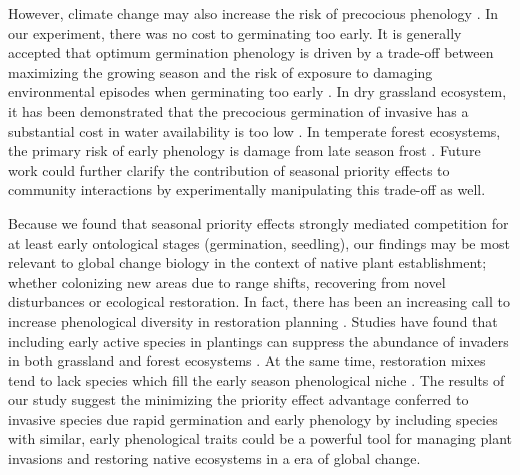 \documentclass{article}[11pt]
\begin{document}
However, climate change may also increase the risk of precocious phenology \citep{Inouye:2000ud}. In our experiment, there was no cost to germinating too early. It is generally accepted that optimum germination phenology is driven by a trade-off between maximizing the growing season and the risk of exposure to damaging environmental episodes when germinating too early \citep{Augspurger:2017vu}. In dry grassland ecosystem, it has been demonstrated that the precocious germination of invasive has a substantial cost in water availability is too low \citep{Wainwright_2011}. In temperate forest ecosystems, the primary risk of early phenology is damage from late season frost \citep{Kollas:2014vn}. Future work could further clarify the contribution of seasonal priority effects to community interactions by experimentally manipulating this trade-off as well.

Because we found that seasonal priority effects strongly mediated competition for at least early ontological stages (germination, seedling), our findings may be most relevant to global change biology in the context of native plant establishment; whether colonizing new areas due to range shifts, recovering from novel disturbances or ecological restoration. In fact, there has been an increasing call to increase phenological diversity in restoration planning \citep{Hess:2019vn}. Studies have found that including early active species in plantings can suppress the abundance of invaders in both grassland \citep{Cleland:2013wo} and forest ecosystems \citep{Schuster:2020ww}. At the same time, restoration mixes tend to lack species which fill the early season phenological niche \citep{Havens:2016vo}. The results of our study suggest the minimizing the priority effect advantage conferred to invasive species due rapid germination and early phenology by including species with similar, early phenological traits could be a powerful tool for managing plant invasions and restoring native ecosystems in a era of global change.
\end{document}
